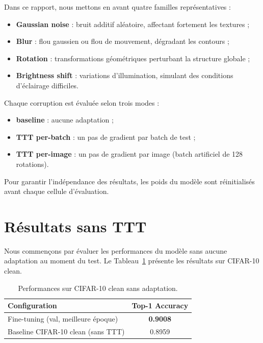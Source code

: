 \documentclass[12pt,a4paper]{report}
\begin{document}
	Dans ce rapport, nous mettons en avant quatre familles représentatives :
	
	\begin{itemize}
		\item \textbf{Gaussian noise} : bruit additif aléatoire, affectant fortement les textures ;
		\item \textbf{Blur} : flou gaussien ou flou de mouvement, dégradant les contours ;
		\item \textbf{Rotation} : transformations géométriques perturbant la structure globale ;
		\item \textbf{Brightness shift} : variations d’illumination, simulant des conditions d’éclairage difficiles.
	\end{itemize}
	
	Chaque corruption est évaluée selon trois modes :
	\begin{itemize}
		\item \textbf{baseline} : aucune adaptation ;
		\item \textbf{TTT per-batch} : un pas de gradient par batch de test ;
		\item \textbf{TTT per-image} : un pas de gradient par image (batch artificiel de 128 rotations).
	\end{itemize}
	
	Pour garantir l’indépendance des résultats, les poids du modèle sont réinitialisés avant chaque cellule d’évaluation.
	
	\section{Résultats sans TTT}
	Nous commençons par évaluer les performances du modèle sans aucune adaptation au moment du test.  
	Le Tableau~\ref{tab:clean_baseline} présente les résultats sur CIFAR-10 clean.
	
	\begin{table}[H]
		\centering
		\begin{tabular}{lc}
			\toprule
			\textbf{Configuration} & \textbf{Top-1 Accuracy} \\
			\midrule
			Fine-tuning (val, meilleure époque) & \textbf{0.9008} \\
			Baseline CIFAR-10 clean (sans TTT) & 0.8959 \\
			\bottomrule
		\end{tabular}
		\caption{Performances sur CIFAR-10 clean sans adaptation.}
		\label{tab:clean_baseline}
	\end{table}
	
\end{document}
